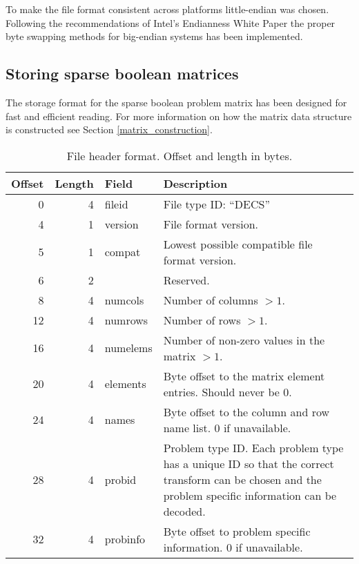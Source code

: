 To make the file format consistent across platforms little-endian was chosen.
Following the recommendations of Intel's Endianness White Paper \cite{intel-endian} the proper byte swapping methods for big-endian systems has been implemented.




\subsection{Storing sparse boolean matrices}

The storage format for the sparse boolean problem matrix has been designed for fast and efficient reading.
For more information on how the matrix data structure is constructed see Section \ref{matrix_construction}.



\begin{table}[htbp]
	\centering
	\begin{tabular}{|r|r|l|p{2.6in}|}
		\hline
		\bf Offset & \bf Length & \bf Field & \bf Description \\ \hline
		0  & 4 & fileid & File type ID: ``DECS'' \\ \hline
		4  & 1 & version & File format version. \\ \hline
		5  & 1 & compat & Lowest possible compatible file format version. \\ \hline
		6  & 2 & & Reserved. \\ \hline
		8  & 4 & numcols & Number of columns $> 1$. \\ \hline
		12 & 4 & numrows & Number of rows $> 1$. \\ \hline
		16 & 4 & numelems & Number of non-zero values in the matrix $> 1$. \\ \hline
		20 & 4 & elements & Byte offset to the matrix element entries. Should never be 0. \\ \hline
		24 & 4 & names & Byte offset to the column and row name list. 0 if unavailable. \\ \hline
		28 & 4 & probid & Problem type ID. Each problem type has a unique ID so that the correct transform can be chosen and the problem specific information can be decoded. \\ \hline
		32 & 4 & probinfo & Byte offset to problem specific information. 0 if unavailable. \\ \hline
	\end{tabular}
	\caption{File header format. Offset and length in bytes.}
	\label{tab:header}
\end{table}

